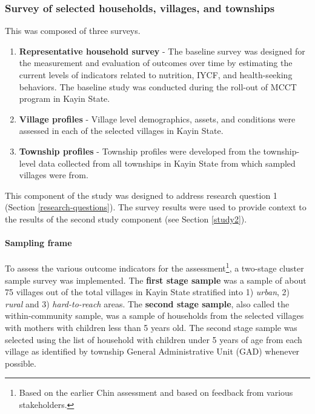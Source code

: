 \documentclass[12pt,a4paper]{article}
\let\oldparagraph\paragraph
\renewcommand{\paragraph}[1]{\oldparagraph{#1}\mbox{}}
\let\rmarkdownfootnote\footnote%
\def\footnote{\protect\rmarkdownfootnote}
\begin{document}
\hypertarget{study1}{%
\subsubsection{Survey of selected households, villages, and townships}\label{study1}}

This was composed of three surveys.

\begin{enumerate}
\def\labelenumi{\arabic{enumi}.}
\item
  \textbf{Representative household survey} - The baseline survey was designed for the measurement and evaluation of outcomes over time by estimating the current levels of indicators related to nutrition, IYCF, and health-seeking behaviors. The baseline study was conducted during the roll-out of MCCT program in Kayin State.
\item
  \textbf{Village profiles} - Village level demographics, assets, and conditions were assessed in each of the selected villages in Kayin State.
\item
  \textbf{Township profiles} - Township profiles were developed from the township-level data collected from all townships in Kayin State from which sampled villages were from.
\end{enumerate}

This component of the study was designed to address research question 1 (Section \ref{research-questions}). The survey results were used to provide context to the results of the second study component (see Section \ref{study2}).

\hypertarget{sampling-frame}{%
\paragraph{Sampling frame}\label{sampling-frame}}

To assess the various outcome indicators for the assessment\footnote{Based on the earlier Chin assessment and based on feedback from various stakeholders.}, a two-stage cluster sample survey was implemented. The \textbf{first stage sample} was a sample of about 75 villages out of the total villages in Kayin State stratified into 1) \emph{urban}, 2) \emph{rural} and 3) \emph{hard-to-reach} areas. The \textbf{second stage sample}, also called the within-community sample, was a sample of households from the selected villages with mothers with children less than 5 years old. The second stage sample was selected using the list of household with children under 5 years of age from each village as identified by township General Administrative Unit (GAD) whenever possible.
\end{document}
